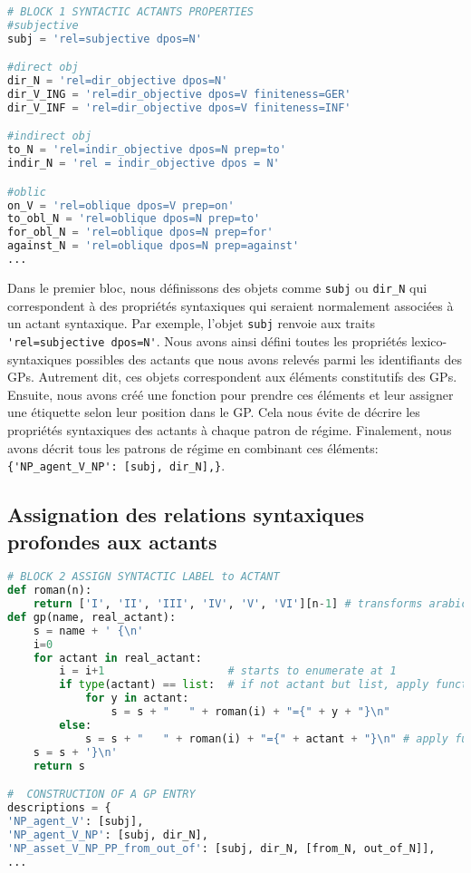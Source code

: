 \begin{lstlisting}[language=Python, caption = Contenu lexical et syntaxique d'un actant non-étiqueté]
# BLOCK 1 SYNTACTIC ACTANTS PROPERTIES
#subjective
subj = 'rel=subjective dpos=N'

#direct obj
dir_N = 'rel=dir_objective dpos=N'
dir_V_ING = 'rel=dir_objective dpos=V finiteness=GER'
dir_V_INF = 'rel=dir_objective dpos=V finiteness=INF'

#indirect obj
to_N = 'rel=indir_objective dpos=N prep=to'
indir_N = 'rel = indir_objective dpos = N'

#oblic
on_V = 'rel=oblique dpos=V prep=on'
to_obl_N = 'rel=oblique dpos=N prep=to' 
for_obl_N = 'rel=oblique dpos=N prep=for'
against_N = 'rel=oblique dpos=N prep=against'
...
\end{lstlisting}

Dans le premier bloc, nous définissons des objets comme \texttt{subj} ou \texttt{dir\_N} qui correspondent à des propriétés syntaxiques qui seraient normalement associées à un actant syntaxique. Par exemple, l'objet \texttt{subj} renvoie aux traits \lstinline|'rel=subjective dpos=N'|. Nous avons ainsi défini toutes les propriétés lexico-syntaxiques possibles des actants que nous avons relevés parmi les identifiants des \acp{GP}. Autrement dit, ces objets correspondent aux éléments constitutifs des \acp{GP}. Ensuite, nous avons créé une fonction pour prendre ces éléments et leur assigner une étiquette selon leur position dans le \ac{GP}. Cela nous évite de décrire les propriétés syntaxiques des actants à chaque patron de régime. Finalement, nous avons décrit tous les patrons de régime en combinant ces éléments: \lstinline|{'NP_agent_V_NP': [subj, dir_N],}|.

\subsection{Assignation des relations syntaxiques profondes aux actants}

\begin{lstlisting}[language=Python, caption = Assignation des relations syntaxiques profondes aux actants et construction des patrons de régime]
# BLOCK 2 ASSIGN SYNTACTIC LABEL to ACTANT
def roman(n):
    return ['I', 'II', 'III', 'IV', 'V', 'VI'][n-1] # transforms arabic numbers in roman numbers
def gp(name, real_actant):
    s = name + ' {\n'
    i=0
    for actant in real_actant:
        i = i+1                   # starts to enumerate at 1
        if type(actant) == list:  # if not actant but list, apply function to actants in list
            for y in actant:
                s = s + "   " + roman(i) + "={" + y + "}\n"
        else:
            s = s + "   " + roman(i) + "={" + actant + "}\n" # apply function to actant
    s = s + '}\n'
    return s 

#  CONSTRUCTION OF A GP ENTRY
descriptions = {
'NP_agent_V': [subj],
'NP_agent_V_NP': [subj, dir_N],
'NP_asset_V_NP_PP_from_out_of': [subj, dir_N, [from_N, out_of_N]],
...
\end{lstlisting}

